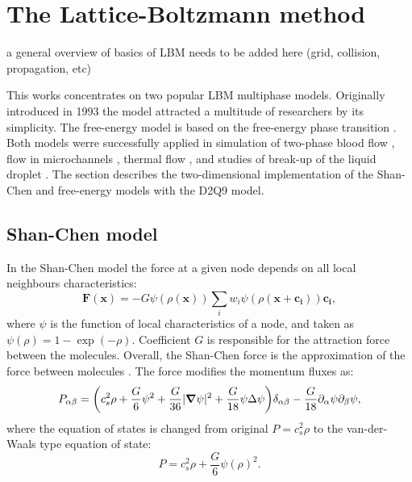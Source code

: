 \documentclass[mathpazo,sort,numbers]{cicp}
\begin{document}
\section{The Lattice-Boltzmann method}

{\color{red} a general overview of basics of LBM needs to be added here (grid, collision, propagation, etc)}

\label{sec:lbm:binary:liquids}
This works concentrates on two popular LBM multiphase models. Originally introduced
in 1993 \cite{Shan-chen:extended} the model attracted a multitude of researchers
by its simplicity.  The free-energy model \cite{swift} is based on the free-energy
phase transition \cite{landau}. Both models werre successfully applied in simulation
of two-phase blood flow \cite{halliday-multicomponent}, flow in microchannels
\cite{pooley-contact}, thermal flow \cite{zhang-thermal}, and studies of break-up
of the liquid droplet \cite{nourgaliev-breakup}. The section describes the
two-dimensional implementation of the Shan-Chen and free-energy models with
the D2Q9 model.

\subsection{Shan-Chen model}
In the Shan-Chen model \cite{Shan-chen:extended} the force at a given node depends
on all local neighbours characteristics:
\begin{equation}  \label{Shan-Chen:Shan-Chen:cont}
\bm{F}(\bm{x})=-G\psi(\rho(\bm{x}))\sum_{i}{w_i \psi(\rho(\bm{x}+\bm{c_i}))\bm{c_{i}}},
\end{equation}
where $\psi$ is the function of local characteristics of a node, and taken
as $\psi(\rho)=1-\exp(-\rho)$. Coefficient $G$ is responsible for the attraction
force between the molecules. Overall, the Shan-Chen force is the approximation of
the force between molecules \cite{kwok,kwok-contact-angle}. The force modifies
the momentum fluxes as:
\begin{equation*}
P_{\alpha\beta}=\biggl(c_s^2\rho+\frac{G}{6}\psi^2+\frac{G}{36}%
|\bm{\nabla}\psi|^2 +\frac{G}{18}\psi\Delta\psi\biggr)\delta_{\alpha\beta}-\frac{G}{%
18}\partial_{\alpha}\psi\partial_{\beta}\psi,
\end{equation*}
where the equation of states is changed from original $P=c_s^2 \rho$ \cite{Succi-book}
to the van-der-Waals type equation of state:
\begin{equation}
P=c_s^2 \rho +\frac{G}{6} \psi(\rho)^2.
\end{equation}
\end{document}
